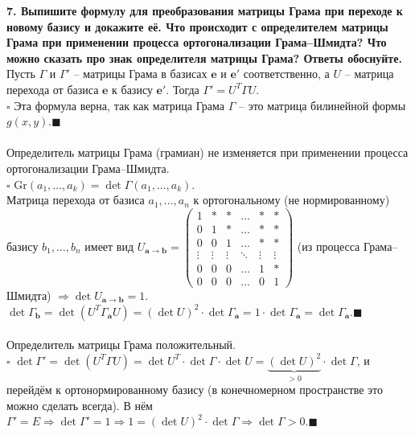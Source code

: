\documentclass[11pt,a4paper]{article}
\renewcommand{\a}{\mathbf{a}}
\renewcommand{\b}{\mathbf{b}}
\newcommand{\e}{\mathbf{e}}
\newcommand{\eprime}{\mathbf{e'}}
\newcommand{\Gr}[1]{\mathrm{Gr}\left(#1\right)}
\newcommand{\proof}{$\square$ }
\newcommand{\qed}{\hfill$\blacksquare$}
\begin{document}
\textbf{7. Выпишите формулу для преобразования матрицы Грама при переходе к новому базису и докажите её. Что происходит с определителем матрицы Грама при применении процесса ортогонализации Грама--Шмидта? Что можно сказать про знак определителя матрицы Грама? Ответы обоснуйте.\\}
Пусть $\Gamma$ и $\Gamma'$ -- матрицы Грама в базисах $\e$ и $\eprime$ соответственно, а $U$ -- матрица перехода от базиса $\e$ к базису $\eprime$. Тогда $\Gamma' = U^T \Gamma U$.\\
\proof Эта формула верна, так как матрица Грама $\Gamma$ -- это матрица билинейной формы $g(x, y)$.\qed\\\\
Определитель матрицы Грама (грамиан) не изменяется при применении процесса ортогонализации Грама--Шмидта.\\
\proof $\Gr{a_1, \hdots, a_k} = \det \Gamma(a_1, \hdots, a_k)$.\\
Матрица перехода от базиса $a_1, \hdots, a_n$ к ортогональному (не нормированному) базису $b_1, \hdots, b_n$ имеет вид $U_{\a \rightarrow \b} = \left( \begin{matrix}
1 & * & * & \hdots & * & * \\
0 & 1 & * & \hdots & * & * \\
0 & 0 & 1 & \hdots & * & * \\
\vdots & \vdots & \vdots & \ddots & \vdots & \vdots \\
0 & 0 & 0 & \hdots & 1 & * \\
0 & 0 & 0 & \hdots & 0 & 1
\end{matrix} \right)$ (из процесса Грама--Шмидта) $\Rightarrow \det U_{\a \rightarrow \b} = 1$.\\
$\det \Gamma_\b = \det(U^T \Gamma_\a U) = (\det U)^2 \cdot \det \Gamma_\a = 1 \cdot \det \Gamma_\a = \det \Gamma_\a$.\qed\\\\
Определитель матрицы Грама положительный.\\
\proof $\det \Gamma' = \det (U^T \Gamma U) = \det U^T \cdot \det \Gamma \cdot \det U = \underbrace{(\det U)^2}_{> 0} \cdot \det \Gamma$, и перейдём к ортонормированному базису (в конечномерном пространстве это можно сделать всегда). В нём $\Gamma' = E \Rightarrow \det \Gamma' = 1 \Rightarrow 1 = (\det U)^2 \cdot \det \Gamma \Rightarrow \det \Gamma > 0$.\qed
\end{document}
